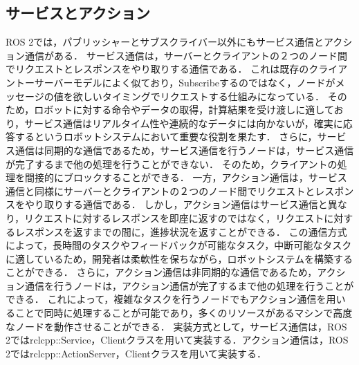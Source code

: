 \subsection{サービスとアクション}
ROS 2では，パブリッシャーとサブスクライバー以外にもサービス通信とアクション通信がある．
サービス通信は，サーバーとクライアントの２つのノード間でリクエストとレスポンスをやり取りする通信である．
これは既存のクライアントーサーバーモデルによく似ており，Subscribeするのではなく，ノードがメッセージの値を欲しいタイミングでリクエストする仕組みになっている．
そのため，ロボットに対する命令やデータの取得，計算結果を受け渡しに適しており，サービス通信はリアルタイム性や連続的なデータには向かないが，確実に応答するというロボットシステムにおいて重要な役割を果たす．
さらに，サービス通信は同期的な通信であるため，サービス通信を行うノードは，サービス通信が完了するまで他の処理を行うことができない．
そのため，クライアントの処理を間接的にブロックすることができる．
一方，アクション通信は，サービス通信と同様にサーバーとクライアントの２つのノード間でリクエストとレスポンスをやり取りする通信である．
しかし，アクション通信はサービス通信と異なり，リクエストに対するレスポンスを即座に返すのではなく，リクエストに対するレスポンスを返すまでの間に，進捗状況を返すことができる．
この通信方式によって，長時間のタスクやフィードバックが可能なタスク，中断可能なタスクに適しているため，開発者は柔軟性を保ちながら，ロボットシステムを構築することができる．
さらに，アクション通信は非同期的な通信であるため，アクション通信を行うノードは，アクション通信が完了するまで他の処理を行うことができる．
これによって，複雑なタスクを行うノードでもアクション通信を用いることで同時に処理することが可能であり，多くのリソースがあるマシンで高度なノードを動作させることができる．
実装方式として，サービス通信は，ROS 2ではrclcpp::Service，Clientクラスを用いて実装する．アクション通信は，ROS 2ではrclcpp::ActionServer，Clientクラスを用いて実装する．

